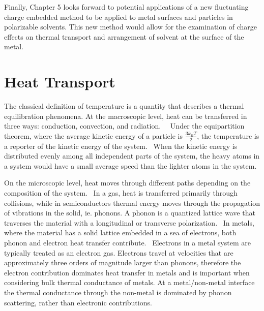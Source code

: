 Finally, Chapter 5 looks forward to potential applications of a new fluctuating charge embedded method to be applied to metal surfaces and particles in polarizable solvents. This new method would allow for the examination of charge effects on thermal transport and arrangement of solvent at the surface of the metal.

\section{Heat Transport}
The classical definition of temperature is a quantity that describes a thermal equilibration phenomena. At the macroscopic level, heat can be transferred in three ways: conduction, convection, and radiation.~~\cite{Chen2005} 
Under the equipartition theorem, where the average kinetic energy of a particle is \(\frac{3k_{B}T}{2}\), the temperature is a reporter of the kinetic energy of the system.~\cite{Goldstein2001}
When the kinetic energy is distributed evenly among all independent parts of the system, the heavy atoms in a system would have a small average speed than the lighter atoms in the system. 

On the microscopic level, heat moves through different paths depending on the composition of the system.~\cite{Chen2005}
In a gas, heat is transferred primarily through collisions, while in semiconductors thermal energy moves through the propagation of vibrations in the solid, ie. phonons. 
A phonon is a quantized lattice wave that traverses the material with a longitudinal or transverse polarization.~\cite{Kittel} 
In metals, where the material has a solid lattice embedded in a sea of electrons, both phonon and electron heat transfer contribute.~\cite{Kittel} 
Electrons in a metal system are typically treated as an electron gas.
Electrons travel at velocities that are approximately three orders of magnitude larger than phonons, therefore the electron contribution dominates heat transfer in metals and is important when considering bulk thermal conductance of metals.
At a metal/non-metal interface the thermal conductance through the non-metal is dominated by phonon scattering, rather than electronic contributions.~\cite{Chen2005, Cahill2011, Stoner1993}

